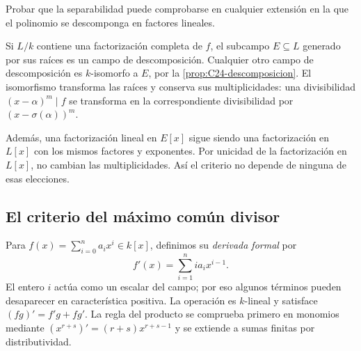 \begin{ejer}\label{ejer:C25-multiplicidades}
Probar que la separabilidad puede comprobarse en cualquier extensión en la que el polinomio se descomponga en factores lineales.
\end{ejer}
\begin{sol}
Si $L/k$ contiene una factorización completa de $f$, el subcampo $E\subseteq L$ generado por sus raíces es un campo de descomposición. Cualquier otro campo de descomposición es $k$-isomorfo a $E$, por la \cref{prop:C24-descomposicion}. El isomorfismo transforma las raíces y conserva sus multiplicidades: una divisibilidad $(x-\alpha)^m\mid f$ se transforma en la correspondiente divisibilidad por $(x-\sigma(\alpha))^m$.

Además, una factorización lineal en $E[x]$ sigue siendo una factorización en $L[x]$ con los mismos factores y exponentes. Por unicidad de la factorización en $L[x]$, no cambian las multiplicidades. Así el criterio no depende de ninguna de esas elecciones.
\end{sol}

\subsection{El criterio del máximo común divisor}
Para $f(x)=\sum_{i=0}^n a_ix^i\in k[x]$, definimos su \emph{derivada formal} por
\[
f'(x)=\sum_{i=1}^n i a_i x^{i-1}.
\]
El entero $i$ actúa como un escalar del campo; por eso algunos términos pueden desaparecer en característica positiva. La operación es $k$-lineal y satisface $(fg)'=f'g+fg'$. La regla del producto se comprueba primero en monomios mediante $(x^{r+s})'=(r+s)x^{r+s-1}$ y se extiende a sumas finitas por distributividad.

